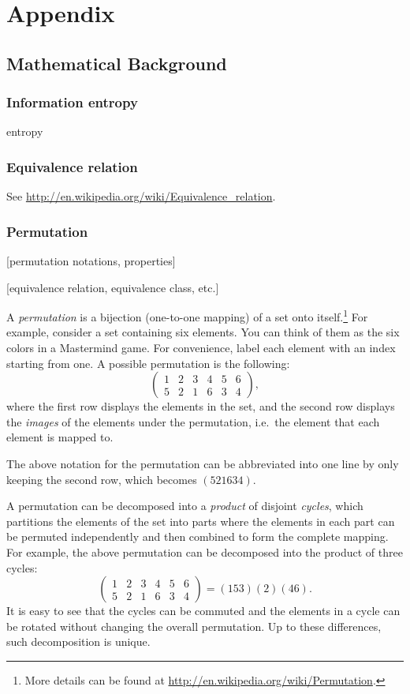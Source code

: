 \section{Appendix}

\subsection{Mathematical Background}

\subsubsection{Information entropy}

entropy

\subsubsection{Equivalence relation}

See \url{http://en.wikipedia.org/wiki/Equivalence\_relation}.

\subsubsection{Permutation}

[permutation notations, properties]

[equivalence relation, equivalence class, etc.]

A \emph{permutation} is a bijection (one-to-one mapping) of a set onto itself.\footnote{
More details can be found at \url{http://en.wikipedia.org/wiki/Permutation}.}
For example, consider a set containing six elements. You can think of them as the six colors in a Mastermind game. For convenience, label each element with an index starting from one. A possible permutation is the following:
\[
\begin{pmatrix}
1 & 2 & 3 & 4 & 5 & 6 \\
5 & 2 & 1 & 6 & 3 & 4
\end{pmatrix} ,
\]
where the first row displays the elements in the set, and the second row displays the \emph{images} of the elements under the permutation, i.e.\ the element that each element is mapped to.

The above notation for the permutation can be abbreviated into one line by only keeping the second row, which becomes $(5 2 1 6 3 4)$.

A permutation can be decomposed into a \emph{product} of disjoint \emph{cycles}, which partitions the elements of the set into parts where the elements in each part can be permuted independently and then combined to form the complete mapping. For example, the above permutation can be decomposed into the product of three cycles:
\[
\begin{pmatrix}
1 & 2 & 3 & 4 & 5 & 6 \\
5 & 2 & 1 & 6 & 3 & 4
\end{pmatrix} 
= (1 5 3) (2) (4 6) .
\]
It is easy to see that the cycles can be commuted and the elements in a cycle can be rotated without changing the overall permutation. Up to these differences, such decomposition is unique.

